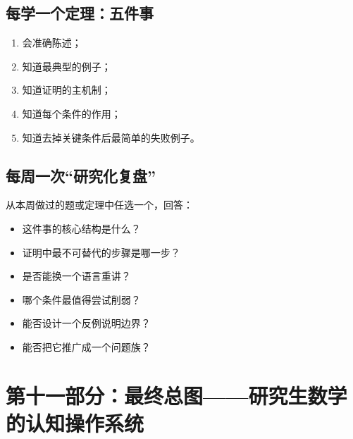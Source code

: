 \documentclass[11pt,a4paper]{ctexart}
\begin{document}
\subsection{每学一个定理：五件事}

\begin{enumerate}
  \item 会准确陈述；
  \item 知道最典型的例子；
  \item 知道证明的主机制；
  \item 知道每个条件的作用；
  \item 知道去掉关键条件后最简单的失败例子。
\end{enumerate}

\subsection{每周一次“研究化复盘”}

从本周做过的题或定理中任选一个，回答：
\begin{itemize}
  \item 这件事的核心结构是什么？
  \item 证明中最不可替代的步骤是哪一步？
  \item 是否能换一个语言重讲？
  \item 哪个条件最值得尝试削弱？
  \item 能否设计一个反例说明边界？
  \item 能否把它推广成一个问题族？
\end{itemize}

\section{第十一部分：最终总图——研究生数学的认知操作系统}
\end{document}
